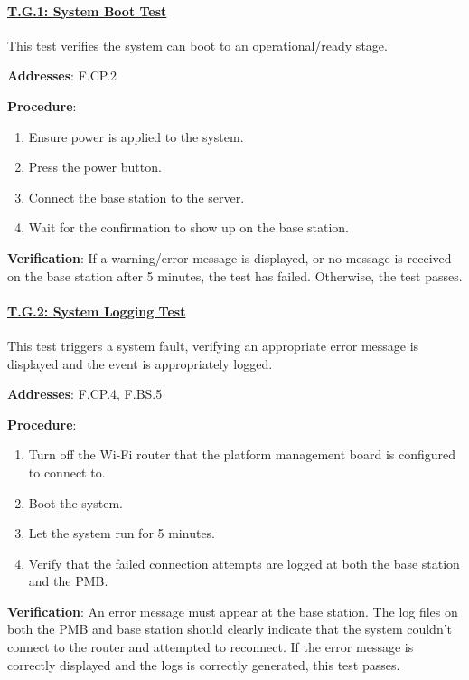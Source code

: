 \paragraph{\underline{T.G.1: System Boot Test}}

This test verifies the system can boot to an operational/ready stage.

\textbf{Addresses}: F.CP.2

\textbf{Procedure}:
\begin{enumerate}[noitemsep]
    \item Ensure power is applied to the system.
    \item Press the power button.
    \item Connect the base station to the server.
    \item Wait for the confirmation to show up on the base station.
\end{enumerate}

\textbf{Verification}: 
If a warning/error message is displayed, or no message is received on the base station after 5 minutes, the test has failed. Otherwise, the test passes.

%

\paragraph{\underline{T.G.2: System Logging Test}}

This test triggers a system fault, verifying an appropriate error message is displayed and the event is appropriately logged.

\textbf{Addresses}: F.CP.4, F.BS.5

\textbf{Procedure}:
\begin{enumerate}[noitemsep]
    \item Turn off the Wi-Fi router that the platform management board is configured to connect to.
    \item Boot the system.
    \item Let the system run for 5 minutes.
    \item Verify that the failed connection attempts are logged at both the base station and the PMB.
\end{enumerate}

\textbf{Verification}: 
An error message must appear at the base station. The log files on both the PMB and base station should clearly indicate that the system couldn't connect to the router and attempted to reconnect. If the error message is correctly displayed and the logs is correctly generated, this test passes.

